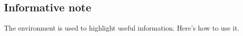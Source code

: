 \documentclass[10pt, a4paper]{article}
\begin{document}

\subsection{Informative note}

The  environment is used to highlight useful information. Here's how to use it.

\end{document}
